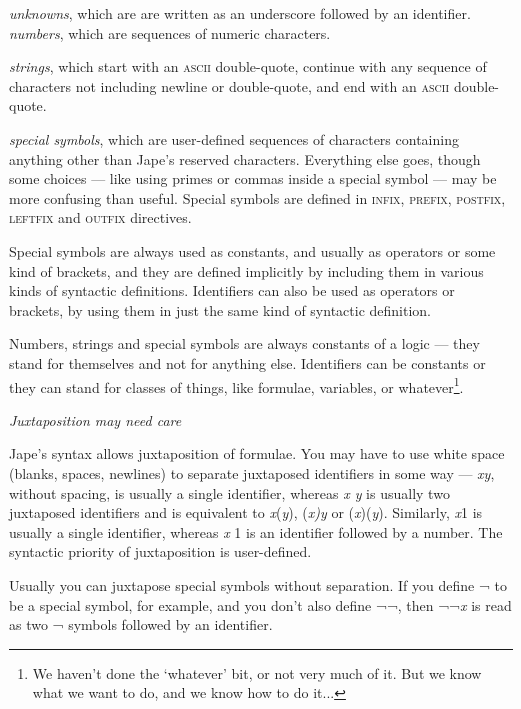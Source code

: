 {\textbullet}\tab \textit{unknowns}, which are are written as an underscore followed by an identifier.\\
{\textbullet}\tab \textit{numbers}, which are sequences of numeric characters.


{\textbullet}\tab \textit{strings}, which start with an \textsc{ascii} double-quote, continue with any sequence of characters not including newline or double-quote, and end with an \textsc{ascii} double-quote.


{\textbullet}\tab \textit{special symbols}, which are user-defined sequences of characters containing anything other than Jape's reserved characters. Everything else goes, though some choices --- like using primes or commas inside a special symbol --- may be more confusing than useful. Special symbols are defined in \textsc{infix, prefix, postfix, leftfix} and \textsc{outfix} directives.


Special symbols are always used as constants, and usually as operators or some kind of brackets, and they are defined implicitly by including them in various kinds of syntactic definitions. Identifiers can also be used as operators or brackets, by using them in just the same kind of syntactic definition.


Numbers, strings and special symbols are always constants of a logic --- they stand for themselves and not for anything else. Identifiers can be constants or they can stand for classes of things, like formulae, variables, or whatever\footnote{We haven't done the `whatever' bit, or not very much of it. But we know what we want to do, and we know how to do it...}.


\textit{Juxtaposition may need care}


Jape's syntax allows juxtaposition of formulae. You may have to use white space (blanks, spaces, newlines) to separate juxtaposed identifiers in some way --- \textit{xy}, without spacing, is usually a single identifier, whereas \textit{x y} is usually two juxtaposed identifiers and is equivalent to \textit{x}(\textit{y}), (\textit{x)y} or (\textit{x})(\textit{y}). Similarly, \textit{x}1 is usually a single identifier, whereas \textit{x} 1 is an identifier followed by a number. The syntactic priority of juxtaposition is user-defined.


Usually you can juxtapose special symbols without separation. If you define ¬ to be a special symbol, for example, and you don't also define ¬¬, then ¬¬\textit{x} is read as two ¬ symbols followed by an identifier.


